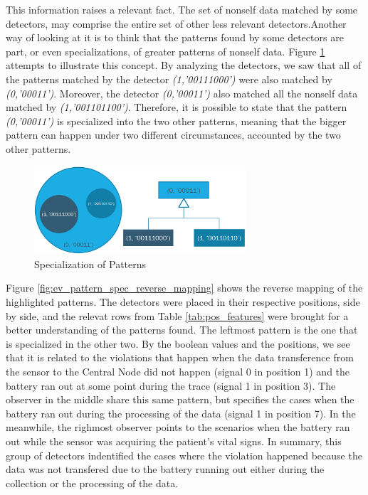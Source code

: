 This information raises a relevant fact. The set of nonself data matched by some detectors, may comprise the entire set of other less relevant detectors.Another way of looking at it is to think that the patterns found by some detectors are part, or even specializations, of greater patterns of nonself data. Figure \ref{fig:ev_pattern_spec} attempts to illustrate this concept. By analyzing the detectors, we saw that all of the patterns matched by the detector \textit{(1,'00111000')} were also matched by \textit{(0,'00011')}. Moreover, the detector \textit{(0,'00011')} also matched all the nonself data matched by \textit{(1,'001101100')}. Therefore, it is possible to state that the pattern \textit{(0,'00011')} is specialized into the two other patterns, meaning that the bigger pattern can happen under two different circumstances, accounted by the two other patterns.

\begin{figure}[]
	\centering
	\includegraphics[width=0.7\textwidth, keepaspectratio]{img/pattern_specialization.png}
	\caption{Specialization of Patterns}
	\label{fig:ev_pattern_spec}
\end{figure}

Figure \ref{fig:ev_pattern_spec_reverse_mapping} shows the reverse mapping of the highlighted patterns. The detectors were placed in their respective positions, side by side, and the relevat rows from Table \ref{tab:pos_features} were brought for a better understanding of the patterns found. The leftmost pattern is the one that is specialized in the other two. By the boolean values and the positions, we see that it is related to the violations that happen when the data transference from the sensor to the Central Node did not happen (signal 0 in position 1) and the battery ran out at some point during the trace (signal 1 in position 3). The observer in the middle share this same pattern, but specifies the cases when the battery ran out during the processing of the data (signal 1 in position 7). In the meanwhile, the righmost observer points to the scenarios when the battery ran out while the sensor was acquiring the patient's vital signs. In summary, this group of detectors indentified the cases where the violation happened because the data was not transfered due to the battery running out either during the collection or the processing of the data.


